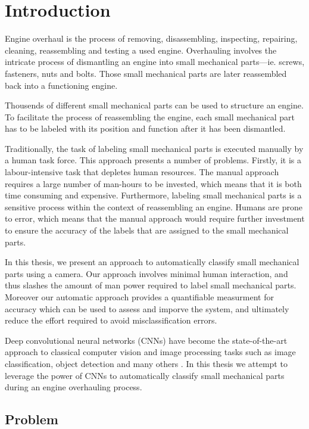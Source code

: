 \chapter{Introduction}

Engine overhaul is the process of removing, disassembling, inspecting, repairing, cleaning, reassembling and testing a used engine. Overhauling involves the intricate process of dismantling an engine into small mechanical parts—ie. screws, fasteners, nuts and bolts. Those small mechanical parts are later reassembled back into a functioning engine.

Thousends of different small mechanical parts can be used to structure an engine. To facilitate the process of reassembling the engine, each small mechanical part has to be labeled with its position and function after it has been dismantled.

Traditionally, the task of labeling small mechanical parts is executed manually by a human task force. This approach presents a number of problems. Firstly, it is a labour-intensive task that depletes human resources. The manual approach requires a large number of man-hours to be invested, which means that it is both time consuming and expensive. Furthermore, labeling small mechanical parts is a sensitive process within the context of reassembling an engine. Humans are prone to error, which means that the manual approach would require further investment to ensure the accuracy of the labels that are assigned to the small mechanical parts.

In this thesis, we present an approach to automatically classify small mechanical parts using a camera. Our approach involves minimal human interaction, and thus slashes the amount of man power required to label small mechanical parts. Moreover our automatic approach provides a quantifiable measurment for accuracy which can be used to assess and imporve the system, and ultimately reduce the effort required to avoid misclassification errors.

Deep convolutional neural networks (CNNs) have become the state-of-the-art approach to classical computer vision and image processing tasks such as image classification, object detection and many others \cite{krizhevsky2012imagenet} \cite{szegedy2015going}. In this thesis we attempt to leverage the power of CNNs to automatically classify small mechanical parts during an engine overhauling process.

\section{Problem}

